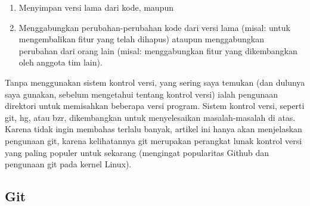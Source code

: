 \begin{enumerate}
\item Menyimpan versi lama dari kode, maupun
\item Menggabungkan perubahan-perubahan kode dari versi lama (misal: 
untuk mengembalikan fitur yang telah dihapus) ataupun menggabungkan 
perubahan dari orang lain (misal: menggabungkan fitur yang dikembangkan 
oleh anggota tim lain).
\setcounter{numberedCntC}{\theenumi}
\end{enumerate}
Tanpa menggunakan sistem kontrol versi, yang sering saya temukan (dan 
dulunya saya gunakan, sebelum mengetahui tentang kontrol versi) ialah 
pengunaan direktori untuk memisahkan beberapa versi program.
\vspace{12pt}
Sistem kontrol versi, seperti git, hg, atau bzr, dikembangkan untuk 
menyelesaikan masalah-masalah di atas. Karena tidak ingin membahas 
terlalu banyak, artikel ini hanya akan menjelaskan pengunaan git, karena 
kelihatannya git merupakan perangkat lunak kontrol versi yang paling 
populer untuk sekarang (mengingat popularitas Github dan pengunaan git 
pada kernel Linux).
\vspace{12pt}


\subsection{Git}

